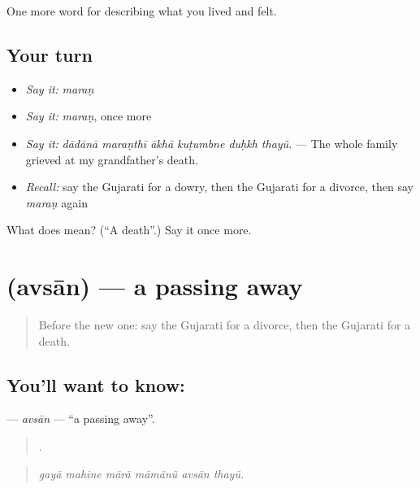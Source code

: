 \begin{grammarlens}[title={What you've built}]
One more word for describing what you lived and felt.
\end{grammarlens}

\subsection*{Your turn}
\begin{itemize}
\raggedright
  \item \emph{Say it:} \emph{maraṇ}
  \item \emph{Say it:} \emph{maraṇ}, once more
  \item \emph{Say it:} \emph{dādānā maraṇthī ākhā kuṭumbne duḥkh thayũ.} — The whole family grieved at my grandfather's death.
  \item \emph{Recall:} say the Gujarati for a dowry, then the Gujarati for a divorce, then say \emph{maraṇ} again
\end{itemize}

\begin{tcolorbox}[breakable,colback=teal!4,colframe=teal!35!black,title={Before you move on}]
What does  mean? (\textquotedblleft{}A death\textquotedblright{}.) Say it once more.
\end{tcolorbox}
\section[\texorpdfstring{\gu{અવસાન} (avsān)}{અવસાન (avsān)}]{ (avsān) — a passing away}

\label{lesson:GU-C499-avsan}



\begin{quote}
Before the new one: say the Gujarati for a divorce, then the Gujarati for a death.
\end{quote}

\subsection*{You'll want to know: }
\textbf{} — \emph{avsān} — \textquotedblleft{}a passing away\textquotedblright{}.

\begin{quote}
     .
\end{quote}

\begin{quote}
\emph{gayā mahine mārā māmānũ avsān thayũ.}
\end{quote}

